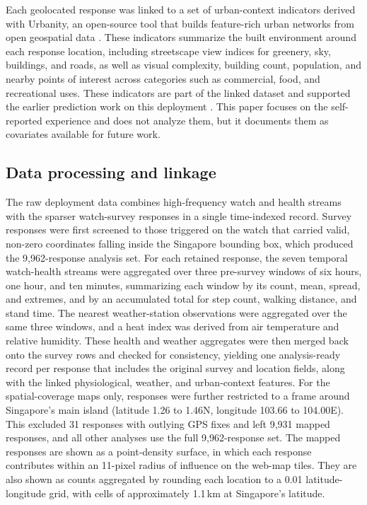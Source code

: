 \documentclass[]{interact}
\begin{document}
Each geolocated response was linked to a set of urban-context indicators derived with Urbanity, an open-source tool that builds feature-rich urban networks from open geospatial data \citep{Yap2023-xs}.
These indicators summarize the built environment around each response location, including streetscape view indices for greenery, sky, buildings, and roads, as well as visual complexity, building count, population, and nearby points of interest across categories such as commercial, food, and recreational uses.
These indicators are part of the linked dataset and supported the earlier prediction work on this deployment \citep{Miller2023-wi,Miller2025-qu}.
This paper focuses on the self-reported experience and does not analyze them, but it documents them as covariates available for future work.

\subsection{Data processing and linkage}\label{sec:methods-eda}

The raw deployment data combines high-frequency watch and health streams with the sparser watch-survey responses in a single time-indexed record.
Survey responses were first screened to those triggered on the watch that carried valid, non-zero coordinates falling inside the Singapore bounding box, which produced the 9{,}962-response analysis set.
For each retained response, the seven temporal watch-health streams were aggregated over three pre-survey windows of six hours, one hour, and ten minutes, summarizing each window by its count, mean, spread, and extremes, and by an accumulated total for step count, walking distance, and stand time.
The nearest weather-station observations were aggregated over the same three windows, and a heat index was derived from air temperature and relative humidity.
These health and weather aggregates were then merged back onto the survey rows and checked for consistency, yielding one analysis-ready record per response that includes the original survey and location fields, along with the linked physiological, weather, and urban-context features.
For the spatial-coverage maps only, responses were further restricted to a frame around Singapore's main island (latitude 1.26 to 1.46\textdegree N, longitude 103.66 to 104.00\textdegree E).
This excluded 31 responses with outlying GPS fixes and left 9{,}931 mapped responses, and all other analyses use the full 9{,}962-response set.
The mapped responses are shown as a point-density surface, in which each response contributes within an 11-pixel radius of influence on the web-map tiles.
They are also shown as counts aggregated by rounding each location to a 0.01\textdegree{} latitude-longitude grid, with cells of approximately 1.1\,km at Singapore's latitude.
\end{document}
